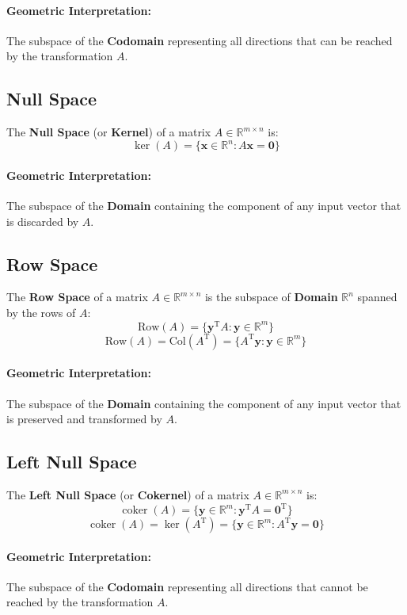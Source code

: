 \documentclass{article}
\begin{document}
\paragraph{Geometric Interpretation:} The subspace of the \textbf{Codomain} representing all directions that can be reached by the transformation $A$.

\subsection{Null Space}
The \textbf{Null Space} (or \textbf{Kernel}) of a matrix $A \in \mathbb{R}^{m \times n}$ is:
\[
    \ker(A) = \{ \mathbf{x} \in \mathbb{R}^n : A\mathbf{x} = \mathbf{0} \}
\]
\paragraph{Geometric Interpretation:} The subspace of the \textbf{Domain} containing the component of any input vector that is discarded by $A$.

\subsection{Row Space}
The \textbf{Row Space} of a matrix $A \in \mathbb{R}^{m \times n}$ is the subspace of \textbf{Domain} $\mathbb{R}^n$ spanned by the rows of $A$:
\[
    \text{Row}(A) = \{ \mathbf{y}^{\mathrm{T}} A : \mathbf{y} \in \mathbb{R}^m \}
\]
\[
    \text{Row}(A) = \text{Col}(A^{\mathrm{T}}) = \{ A^{\mathrm{T}}\mathbf{y} : \mathbf{y} \in \mathbb{R}^m \}
\]
\paragraph{Geometric Interpretation:} The subspace of the \textbf{Domain} containing the component of any input vector that is preserved and transformed by $A$.

\subsection{Left Null Space}
The \textbf{Left Null Space} (or \textbf{Cokernel}) of a matrix $A \in \mathbb{R}^{m \times n}$ is:
\[
    \operatorname{coker}(A) = \{ \mathbf{y} \in \mathbb{R}^m : \mathbf{y}^{\mathrm{T}} A = \mathbf{0}^{\mathrm{T}} \}
\]
\[
    \operatorname{coker}(A) = \ker(A^{\mathrm{T}}) = \{ \mathbf{y} \in \mathbb{R}^m : A^{\mathrm{T}} \mathbf{y} = \mathbf{0} \}
\]
\paragraph{Geometric Interpretation:} The subspace of the \textbf{Codomain} representing all directions that cannot be reached by the transformation $A$.
\end{document}

